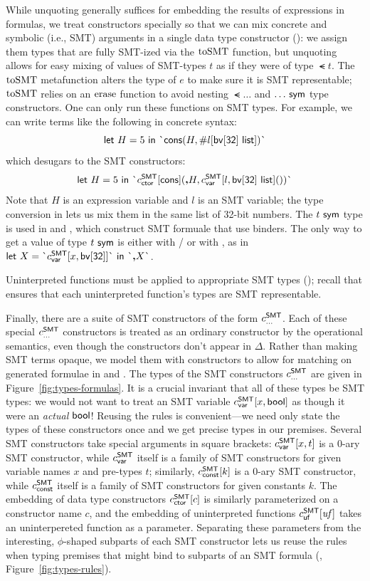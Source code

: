 \documentclass[acmsmall,screen,nonacm]{acmart}
\theoremstyle{definition}
\begin{document}
While unquoting generally suffices for embedding the results of
expressions in formulas, we treat constructors specially so that we
can mix concrete and symbolic (i.e., SMT) arguments in a single
data type constructor (): we assign them types that
are fully SMT-ized via the $\mathrm{toSMT}$ function, but unquoting allows for
easy mixing of values of SMT-types $t$ as if they were of type
$\smt{t}$.
%
The $\mathrm{toSMT}$ metafunction alters the type of $e$ to make sure it is
SMT representable; $\mathrm{toSMT}$ relies on an $\mathrm{erase}$ function to avoid
nesting $\smt{\dots}$ and ${\dots} ~ \mathsf{sym}$ type constructors. One can
only run these functions on SMT types.
%
For example, we can write terms like the following in concrete syntax:
%
\[ \mathsf{let} ~ {H} = {5} ~ \mathsf{in} ~ {\textsf{\`{}}{\mathsf{cons}(H, \#l[\ensuremath{\mathsf{bv[32]}} ~ \mathsf{list}])}\textsf{\`{}}} \]
%
which desugars to the SMT constructors:
%
\[ \mathsf{let} ~ {H} = {5} ~ \mathsf{in} ~ {\textsf{\`{}}{\ensuremath{c^\mathsf{SMT}_{\mathsf{ctor}}}[\mathsf{cons}](\ensuremath{\textbf{,}{H}}, \ensuremath{c^\mathsf{SMT}_{\mathsf{var}}}[l,\ensuremath{\mathsf{bv[32]}} ~ \mathsf{list}]())}\textsf{\`{}}} \]
%
Note that $H$ is an expression variable and $l$ is an SMT variable;
the type conversion in  lets us mix them in the
same list of 32-bit numbers.
%
The ${t} ~ \mathsf{sym}$ type is used in  and ,
which construct SMT formuale that use binders.
%
The only way to get a value of type ${t} ~ \mathsf{sym}$ is either
with / or with , as in
$\mathsf{let} ~ {X} = {\textsf{\`{}}{\ensuremath{c^\mathsf{SMT}_{\mathsf{var}}}[x,\ensuremath{\mathsf{bv[32]}}]}\textsf{\`{}}} ~ \mathsf{in} ~ {\textsf{\`{}}{\ensuremath{\textbf{,}{X}}}\textsf{\`{}}}$.

Uninterpreted functions must be applied to appropriate SMT types
(); recall that  ensures that each
uninterpreted function's types are SMT representable.

Finally, there are a suite of SMT constructors of the form
$c^\mathsf{SMT}_{\mathsf{\dots}}$.
%
Each of these special $c^\mathsf{SMT}_{\mathsf{\dots}}$ constructors is treated as an
ordinary constructor by the operational semantics, even though the
constructors don't appear in $\Delta$.
%
Rather than making SMT terms opaque, we model them with constructors
to allow for matching on generated formulae in 
and . The types of the SMT constructors
$c^\mathsf{SMT}_{\mathsf{\dots}}$ are given in Figure~\ref{fig:types-formulas}.
%
It is a crucial invariant that all of these types be SMT types: we
would not want to treat an SMT variable $c^\mathsf{SMT}_{\mathsf{var}}[x,\mathsf{bool}]$ as though it
were an \emph{actual} $\mathsf{bool}$!
%
Reusing the  rules is convenient---we need only
state the types of these constructors once and we get precise types in
our premises.
%
Several SMT constructors take special arguments in square brackets: $c^\mathsf{SMT}_{\mathsf{var}}[x,t]$ is a 0-ary SMT constructor, while $c^\mathsf{SMT}_{\mathsf{var}}$ itself is a family of SMT constructors for given variable names $x$ and pre-types $t$; similarly, $c^\mathsf{SMT}_{\mathsf{const}}[k]$ is a 0-ary SMT constructor, while $c^\mathsf{SMT}_{\mathsf{const}}$ itself is a family of SMT constructors for given constants $k$. The embedding of data type constructors $c^\mathsf{SMT}_{\mathsf{ctor}}[c]$ is similarly parameterized on a constructor name $c$, and the embedding of uninterpreted functions $c^\mathsf{SMT}_{\mathsf{uf}}[\mathit{uf}]$ takes an uninterpereted function as a parameter.
%
Separating these parameters from the interesting, $\phi$-shaped
subparts of each SMT constructor lets us reuse
the  rules when typing premises that might bind to
subparts of an SMT formula (,
Figure~\ref{fig:types-rules}).
\end{document}
